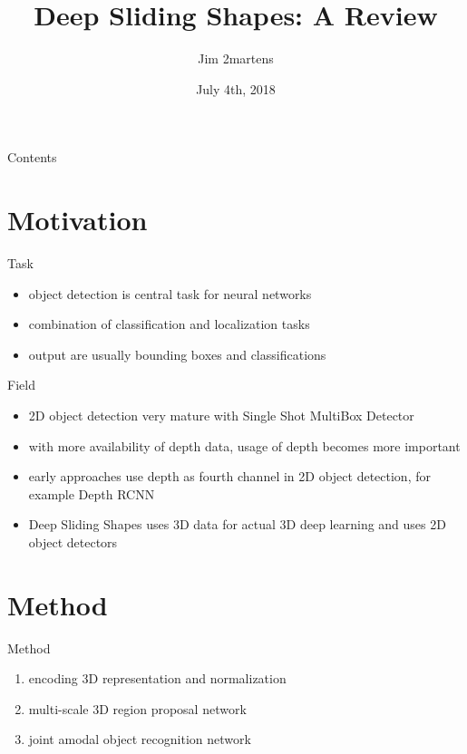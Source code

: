 \documentclass{beamer}
\begin{document}
\author{Jim 2martens}
\title{Deep Sliding Shapes: A Review}
\date{July 4th, 2018}

\begin{frame}
    \titlepage
\end{frame}

\begin{frame}{Contents}
    \tableofcontents
\end{frame}

\section{Motivation}
\begin{frame}{Task}
    \begin{itemize}
        \item object detection is central task for neural networks
        \vfill
        \item combination of classification and localization tasks
        \vfill
        \item output are usually bounding boxes and classifications
    \end{itemize}
\end{frame}

\begin{frame}{Field}
    \begin{itemize}
        \item 2D object detection very mature with Single Shot MultiBox Detector\cite{Liu2016}
        \vfill
        \item with more availability of depth data, usage of depth becomes more
              important
        \vfill
        \item early approaches use depth as fourth channel in 2D object detection,
              for example Depth RCNN\cite{Gupta2015}
        \vfill
        \item Deep Sliding Shapes\cite{Song2016} uses 3D data for actual 3D deep
              learning and uses 2D object detectors
    \end{itemize}
\end{frame}

\section{Method}
\begin{frame}{Method}
    \begin{enumerate}
        \item encoding 3D representation and normalization
        \vfill
        \item multi-scale 3D region proposal network
        \vfill
        \item joint amodal object recognition network
    \end{enumerate}
\end{frame}
\end{document}
